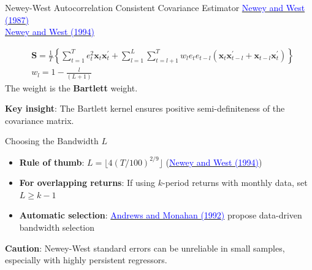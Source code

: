 \documentclass{beamer}
\begin{document}
\begin{frame}{Newey-West Autocorrelation Consistent Covariance Estimator }
	\href{https://doi.org/10.2307/1913610}{\textcolor{blue}{Newey and West (1987)}}\\
	
	\href{https://doi.org/10.2307/2297912}{\textcolor{blue}{Newey and West (1994)}}
	
	\begin{align*}
		&\mathbf{S}=\frac{1}{T}\left\{\sum_{t=1}^{T} e_{t}^{2} \mathbf{x}_{t} \mathbf{x}_{t}^{\prime}+\sum_{l=1}^{L} \sum_{t=l+1}^{T} w_{l} e_{t} e_{t-l}\left(\mathbf{x}_{t} \mathbf{x}_{t-l}^{\prime}+\mathbf{x}_{t-l} \mathbf{x}_{t}^{\prime}\right)\right\} \\
		&w_{l}=1-\frac{l}{(L+1)}
	\end{align*}
The weight is the \textbf{Bartlett} weight.

\vspace{5pt}
\textbf{Key insight}: The Bartlett kernel ensures positive semi-definiteness of the covariance matrix.
\end{frame}

\begin{frame}{Choosing the Bandwidth $L$}
	\begin{itemize}
		\item \textbf{Rule of thumb}: $L = \lfloor 4(T/100)^{2/9} \rfloor$ (\href{https://doi.org/10.2307/2297912}{\textcolor{blue}{Newey and West (1994)}})
		\item \textbf{For overlapping returns}: If using $k$-period returns with monthly data, set $L \geq k-1$
		\item \textbf{Automatic selection}: \href{https://doi.org/10.2307/2951574}{\textcolor{blue}{Andrews and Monahan (1992)}} propose data-driven bandwidth selection
	\end{itemize}
	
	\vspace{10pt}
	\textbf{Caution}: Newey-West standard errors can be unreliable in small samples, especially with highly persistent regressors.
\end{frame}
\end{document}
